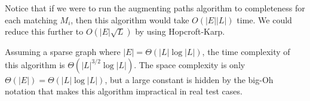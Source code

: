 Notice that if we were to run the augmenting paths algorithm to completeness
for each matching $M_i$, then this algorithm would take $O(|E||L|)$ time. We
could reduce this further to $O(|E|\sqrt{L})$ by using Hopcroft-Karp.
\cite{HopcroftKarp}  

Assuming
a sparse graph where $|E|=\Theta(|L|\log|L|)$, the time complexity of this algorithm is $\Theta(|L|^{3/2}\log|L|)$.  The space complexity
is only $\Theta(|E|) = \Theta(|L|\log|L|)$, but a large constant is hidden by
the big-Oh notation that makes this algorithm impractical in real test cases. 